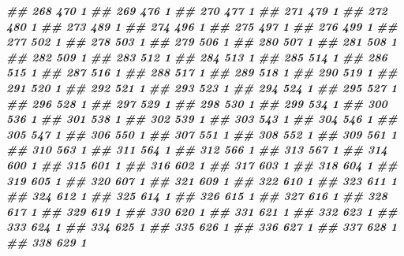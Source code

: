 \documentclass[
]{book}
\newenvironment{Shaded}{\begin{snugshade}}{\end{snugshade}}
\newcommand{\DocumentationTok}[1]{\textcolor[rgb]{0.56,0.35,0.01}{\textbf{\textit{#1}}}}
\theoremstyle{definition}
\theoremstyle{definition}
\theoremstyle{definition}
\theoremstyle{definition}
\theoremstyle{remark}
\begin{document}
\begin{Shaded}
\begin{Highlighting}[]
\DocumentationTok{\#\# 268    470 1}
\DocumentationTok{\#\# 269    476 1}
\DocumentationTok{\#\# 270    477 1}
\DocumentationTok{\#\# 271    479 1}
\DocumentationTok{\#\# 272    480 1}
\DocumentationTok{\#\# 273    489 1}
\DocumentationTok{\#\# 274    496 1}
\DocumentationTok{\#\# 275    497 1}
\DocumentationTok{\#\# 276    499 1}
\DocumentationTok{\#\# 277    502 1}
\DocumentationTok{\#\# 278    503 1}
\DocumentationTok{\#\# 279    506 1}
\DocumentationTok{\#\# 280    507 1}
\DocumentationTok{\#\# 281    508 1}
\DocumentationTok{\#\# 282    509 1}
\DocumentationTok{\#\# 283    512 1}
\DocumentationTok{\#\# 284    513 1}
\DocumentationTok{\#\# 285    514 1}
\DocumentationTok{\#\# 286    515 1}
\DocumentationTok{\#\# 287    516 1}
\DocumentationTok{\#\# 288    517 1}
\DocumentationTok{\#\# 289    518 1}
\DocumentationTok{\#\# 290    519 1}
\DocumentationTok{\#\# 291    520 1}
\DocumentationTok{\#\# 292    521 1}
\DocumentationTok{\#\# 293    523 1}
\DocumentationTok{\#\# 294    524 1}
\DocumentationTok{\#\# 295    527 1}
\DocumentationTok{\#\# 296    528 1}
\DocumentationTok{\#\# 297    529 1}
\DocumentationTok{\#\# 298    530 1}
\DocumentationTok{\#\# 299    534 1}
\DocumentationTok{\#\# 300    536 1}
\DocumentationTok{\#\# 301    538 1}
\DocumentationTok{\#\# 302    539 1}
\DocumentationTok{\#\# 303    543 1}
\DocumentationTok{\#\# 304    546 1}
\DocumentationTok{\#\# 305    547 1}
\DocumentationTok{\#\# 306    550 1}
\DocumentationTok{\#\# 307    551 1}
\DocumentationTok{\#\# 308    552 1}
\DocumentationTok{\#\# 309    561 1}
\DocumentationTok{\#\# 310    563 1}
\DocumentationTok{\#\# 311    564 1}
\DocumentationTok{\#\# 312    566 1}
\DocumentationTok{\#\# 313    567 1}
\DocumentationTok{\#\# 314    600 1}
\DocumentationTok{\#\# 315    601 1}
\DocumentationTok{\#\# 316    602 1}
\DocumentationTok{\#\# 317    603 1}
\DocumentationTok{\#\# 318    604 1}
\DocumentationTok{\#\# 319    605 1}
\DocumentationTok{\#\# 320    607 1}
\DocumentationTok{\#\# 321    609 1}
\DocumentationTok{\#\# 322    610 1}
\DocumentationTok{\#\# 323    611 1}
\DocumentationTok{\#\# 324    612 1}
\DocumentationTok{\#\# 325    614 1}
\DocumentationTok{\#\# 326    615 1}
\DocumentationTok{\#\# 327    616 1}
\DocumentationTok{\#\# 328    617 1}
\DocumentationTok{\#\# 329    619 1}
\DocumentationTok{\#\# 330    620 1}
\DocumentationTok{\#\# 331    621 1}
\DocumentationTok{\#\# 332    623 1}
\DocumentationTok{\#\# 333    624 1}
\DocumentationTok{\#\# 334    625 1}
\DocumentationTok{\#\# 335    626 1}
\DocumentationTok{\#\# 336    627 1}
\DocumentationTok{\#\# 337    628 1}
\DocumentationTok{\#\# 338    629 1}

\end{Highlighting}
\end{Shaded}
\end{document}
